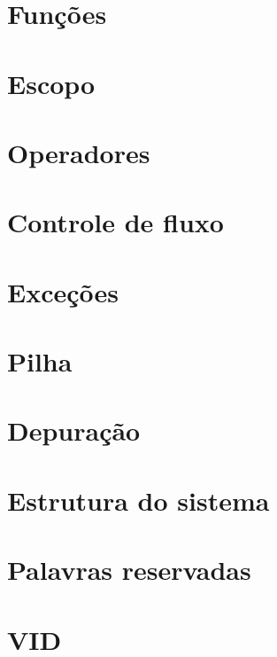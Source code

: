 \documentclass[12pt,a4paper]{article}
\begin{document}
\section{Funções}\label{sec:func}
\section{Escopo}
\section{Operadores}
\section{Controle de fluxo}
\section{Exceções}
\section{Pilha}
\section{Depuração}
\section{Estrutura do sistema}
\section{Palavras reservadas}
\section{VID}
\end{document}

